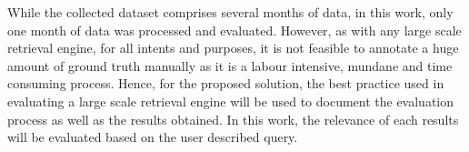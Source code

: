 While the collected dataset comprises several months of data, in this work, only one month of data was processed and evaluated. However, as with any large scale retrieval engine, for all intents and purposes, it is not feasible to annotate a huge amount of ground truth manually as it is a labour intensive, mundane and time consuming process. Hence, for the proposed solution, the best practice used in evaluating a large scale retrieval engine will be used to document the evaluation process as well as the results obtained. In this work, the relevance of each results will be evaluated based on the user described query. 